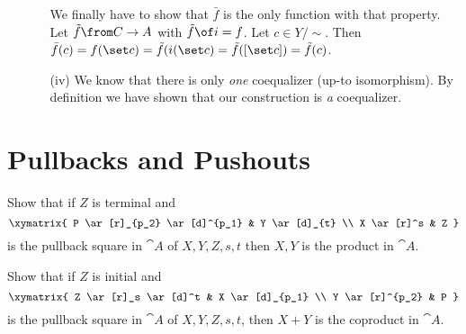\begin{answer}
\begin{itemize}
\begin{itemize}
          We finally have to show that $\bar{f}$ is the only function with that property.
          Let $\tilde{f} \from C \to A$ with $\tilde{f} \of i = f$. Let $c \in Y /\sim$.
          Then $\bar{f}(c) = f(\choice{c}) = \tilde{f}(i(\choice{c}) = \tilde{f}([\choice{c}]) = \tilde{f}(c)$.

        \item[(iv)]We know that there is only \emph{one} coequalizer (up-to isomorphism). By definition we have shown that our construction is \emph{a} coequalizer.
      \end{itemize}

  \end{itemize}
\end{answer}

\section{Pullbacks and Pushouts}

\begin{exercise}
  Show that if $Z$ is terminal and
  \[ \xymatrix{
    P \ar[r]_{p_2} \ar[d]^{p_1} & Y \ar[d]_{t} \\
    X \ar[r]^s & Z
  } \]
  is the pullback square in $\cat{A}$ of $X, Y, Z, s, t$ then $X, Y$ is the product in $\cat{A}$.
\end{exercise}

\begin{exercise}
  Show that if $Z$ is initial and
  \[ \xymatrix{
    Z \ar[r]_s \ar[d]^t & X \ar[d]_{p_1} \\
    Y \ar[r]^{p_2} & P
  } \]
  is the pullback square in $\cat{A}$ of $X, Y, Z, s, t$, then $X + Y$ is the coproduct in $\cat{A}$.
\end{exercise}



